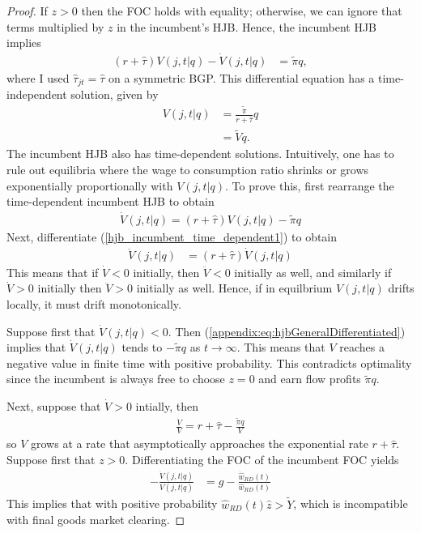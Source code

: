 \documentclass[11pt,english]{article}
\theoremstyle{definition}
\begin{document}
\begin{proof}
	If $z > 0$ then the FOC holds with equality; otherwise, we can ignore that terms multiplied by $z$ in the incumbent's HJB. Hence, the incumbent HJB implies
	\begin{align}
	(r + \hat{\tau}) V(j,t|q) - \dot{V}(j,t|q) &= \tilde{\pi} q, 
	\label{hjb_incumbent_time_dependent}
	\end{align}
	where I used $\hat{\tau}_{jt} = \hat{\tau}$ on a symmetric BGP. This differential equation has a time-independent solution, given by 
	\begin{align}
	V(j,t|q) &= \frac{\tilde{\pi} }{r + \hat{\tau}}  q\\
	&= \tilde{V} q.
	\end{align}
	The incumbent HJB also has time-dependent solutions. Intuitively, one has to rule out equilibria  where the wage to consumption ratio shrinks or grows exponentially proportionally with $V(j,t|q)$. To prove this, first rearrange the time-dependent incumbent HJB to obtain
	\begin{align}
		\dot{V}(j,t|q) = (r + \hat{\tau}) V(j,t|q) - \tilde{\pi} q \label{hjb_incumbent_time_dependent1}
	\end{align} 
	Next, differentiate (\ref{hjb_incumbent_time_dependent1}) to obtain
	\begin{align}
		\ddot{V}(j,t|q) &= (r + \hat{\tau}) \dot{V}(j,t|q) \label{appendix:eq:hjbGeneralDifferentiated}
	\end{align}
	This means that if $\dot{V} < 0$ initially, then $\ddot{V} < 0$ initially as well, and similarly if $\dot{V} > 0$ initially then $\ddot{V} > 0$ initially as well. Hence, if in equilbrium $V(j,t|q)$ drifts locally, it must drift monotonically. 
	
	Suppose first that $\dot{V}(j,t|q) < 0$. Then (\ref{appendix:eq:hjbGeneralDifferentiated}) implies that $\dot{V}(j,t|q)$ tends to $-\tilde{\pi}q$ as $t \to \infty$. This means that $V$ reaches a negative value in finite time with positive probability. This contradicts optimality since the incumbent is always free to choose $z = 0$ and earn flow profits $\tilde{\pi} q$.
	
	Next, suppose that $\dot{V} > 0$ intially, then 
	\begin{align}
		\frac{\dot{V}}{V} = r + \hat{\tau} - \frac{\tilde{\pi} q}{V}
	\end{align}
	so $V$ grows at a rate that asymptotically approaches the exponential rate $r + \hat{\tau}$. Suppose first that $z > 0$. Differentiating the FOC of the incumbent FOC yields
	\begin{align}
		-\frac{\dot{V}(j,t|q)}{V(j,t|q)} &= g - \frac{\dot{\hat{w}}_{RD}(t)}{\hat{w}_{RD}(t)}  \label{appendix:eq:freeEntryDifferentiatedImplication}
	\end{align}
	This implies that with positive probability $\hat{w}_{RD}(t) \hat{z} > \tilde{Y}$, which is incompatible with final goods market clearing. 
	

\end{proof}
\end{document}
